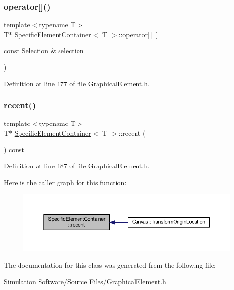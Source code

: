 \subsubsection{\texorpdfstring{operator[]()}{operator[]()}\hspace{0.1cm}{\footnotesize\ttfamily [2/2]}}
{\footnotesize\ttfamily template$<$typename T$>$ \\
T$\ast$ \hyperlink{class_specific_element_container}{Specific\+Element\+Container}$<$ T $>$\+::operator\mbox{[}$\,$\mbox{]} (\begin{DoxyParamCaption}\item[{const \hyperlink{struct_selection}{Selection} \&}]{selection }\end{DoxyParamCaption})\hspace{0.3cm}{\ttfamily [inline]}}



Definition at line 177 of file Graphical\+Element.\+h.

\mbox{\label{class_specific_element_container_a700ee4826baf3ab9735c2ae5c52bcaf3}} 
\subsubsection{\texorpdfstring{recent()}{recent()}}
{\footnotesize\ttfamily template$<$typename T$>$ \\
T$\ast$ \hyperlink{class_specific_element_container}{Specific\+Element\+Container}$<$ T $>$\+::recent (\begin{DoxyParamCaption}{ }\end{DoxyParamCaption}) const\hspace{0.3cm}{\ttfamily [inline]}}



Definition at line 187 of file Graphical\+Element.\+h.

Here is the caller graph for this function\+:
\nopagebreak
\begin{figure}[H]
\begin{center}
\leavevmode
\includegraphics[width=350pt]{class_specific_element_container_a700ee4826baf3ab9735c2ae5c52bcaf3_icgraph}
\end{center}
\end{figure}


The documentation for this class was generated from the following file\+:\begin{DoxyCompactItemize}
\item 
Simulation Software/\+Source Files/\hyperlink{_graphical_element_8h}{Graphical\+Element.\+h}\end{DoxyCompactItemize}

